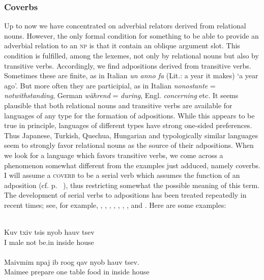 \subsubsection{Coverbs}\label{sec:3.4.1.7}
Up to now we have concentrated on adverbial relators derived from relational nouns. However, the only formal condition for something to be able to provide an adverbial relation to an \textsc{np} is that it contain an oblique argument slot. This condition is fulfilled, among the lexemes, not only by relational nouns but also by transitive verbs. Accordingly, we find adpositions derived from transitive verbs. Sometimes these are finite, as in Italian \textit{un anno fa} (Lit.: a year it makes) ‘a year ago’. But more often they are participial, as in Italian \textit{nonostante} = \textit{notwithstanding}, German \textit{während} = \textit{during}, Engl. \textit{concerning} etc. It seems plausible that both relational nouns and transitive verbs are available for languages of any type for the formation of adpositions. While this appears to be true in principle, languages of different types have strong one-sided preferences. Thus Japanese, Turkish, Quechua, Hungarian and typologically similar languages seem to strongly favor relational nouns as the source of their adpositions. When we look for a language which favors transitive verbs, we come across a phenomenon somewhat different from the examples just adduced, namely coverbs. I will assume a \textsc{coverb} to be a serial verb which assumes the function of an adposition (cf. p.~\pageref{page37}\chk%
), thus restricting somewhat the possible meaning of this term. The development of serial verbs to adpositions has been treated repeatedly in recent times; see, for example, \citealt{LiEtAL1974}, \citealt{Hagège1975}, \citealt[esp. p.~93ff]{Givón1975}, \citealt{Hyman1975}, \citealt[33--40]{Kahr1975}, \citealt[113--117]{Sasse1977a}, \citealt{Huang1978}, \citealt{Clark1979} and \citealt[213--228]{Lightfoot1979}. Here are some examples:

\ea\label{ex:E85}
\\
 \ea
 \gll   Kuv  txiv  tsis  nyob  hauv  tsev\\
   I  male  not  be.in  inside  house\\
\\
\ex
\gll  Maivmim  npaj  ib  roog  qav  nyob  hauv  tsev.\\
Maimee  prepare  one  table  food  in  inside  house\\
\\
\z
\z

